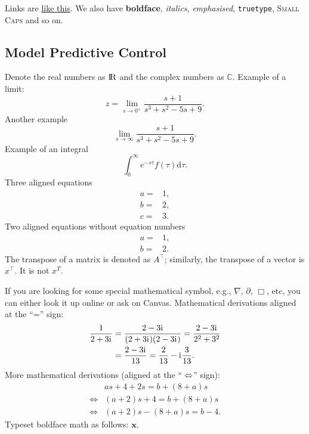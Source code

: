 \documentclass[a4paper,11pt,reqno]{amsart}
\newcommand{\iu}{{\mathrm{i}\mkern1mu}}
\newcommand{\R}{{\rm I\!R}}
\newcommand{\C}{\mathbb{C}}
\newcommand{\dd}{\mathrm{d}}
\newcommand{\tran}{\intercal}
\begin{document}
Links are \href{https://google.com}{like this}. We also have \textbf{boldface}, \textit{italics}, \emph{emphasised}, \texttt{truetype}, \textsc{Small Caps} and so on.


\subsection{Model Predictive Control}
Denote the real numbers as $\R$ and the complex numbers
as $\C$. Example of a limit:
\begin{equation}
    z = \lim_{s\to0^+}\frac{s+1}{s^3+s^2-5s+9}.
\end{equation}
Another example
\begin{equation}
    \lim_{s\to\infty} \frac{s+1}{s^3+s^2-5s+9}.
\end{equation}
Example of an integral
\begin{equation}
    \int_0^\infty e^{-s\tau}f(\tau)\dd\tau.
\end{equation}
Three aligned equations
\begin{align}
    a = & 1,
    \\
    b = & 2,
    \\
    c = & 3.
\end{align}
Two aligned equations without equation numbers
\begin{align*}
    a = & 1,
    \\
    b = & 2.
\end{align*}
The transpose of a matrix is denoted as $A^{\tran}$; similarly, the transpose of a vector is $x^\tran$. It is not $x^T$.

If you are looking for some special mathematical symbol, e.g., $\nabla$, $\partial$, $\Box$, etc, you can either look it up online or ask on Canvas.
Mathematical derivations aligned at the ``='' sign:
\begin{align}
    \frac{1}{2+3\iu} {}={} & \frac{2-3\iu}{(2+3\iu)(2-3\iu)}
    {}={} \frac{2-3\iu}{2^2 + 3^2}
    \notag                                                   \\
    {}={}                  & \frac{2-3\iu}{13}
    {}={} \frac{2}{13} - \iu\frac{3}{13}.
\end{align}
More mathematical derivations (aligned at the $``\Leftrightarrow$'' sign):
\begin{align*}
                      & as + 4 + 2s = b + (8+a)s
    \\
    \Leftrightarrow{} & (a+2)s + 4 = b + (8+a)s
    \\
    \Leftrightarrow{} & (a+2)s - (8+a)s = b - 4.
\end{align*}
Typeset boldface math as follows: $\bm{x}$.\\
\end{document}
